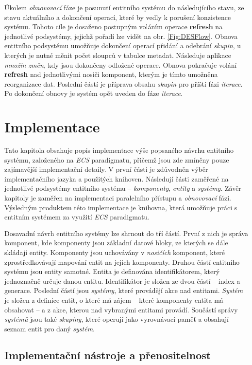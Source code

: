 Úkolem \emph{obnovovací} fáze je posunutí entitního systému do následujícího stavu, ze stavu aktuálního a dokončení operací, které by vedly k porušení konzistence systému. Tohoto cíle je dosaženo postupným voláním operace \textbf{refresh} na jednotlivé podsystémy, jejichž pořadí lze vidět na obr. \ref{Fig:DESFlow}. Obnova entitního podsystému umožňuje dokončení operací přidání a odebrání \emph{skupin}, u kterých je nutné měnit počet sloupců v tabulce metadat. Následuje aplikace \emph{množin změn}, kdy jsou dokončeny odložené operace. Obnova pokračuje volání \textbf{refresh} nad jednotlivými nosiči komponent, kterým je tímto umožněna reorganizace dat. Poslední částí je příprava obsahu \emph{skupin} pro příští fázi \emph{iterace}. Po dokončení obnovy je systém opět uveden do fáze \emph{iterace}.

\chapter{Implementace}

Tato kapitola obsahuje popis implementace výše popsaného návrhu entitního systému, založeného na \emph{ECS} paradigmatu, přičemž jsou zde zmíněny pouze zajímavější implementační detaily. V první části je zdůvodněn výběr implementačního jazyka a použitých knihoven. Následují části zaměřené na jednotlivé podsystémy entitního systému -- \emph{komponenty}, \emph{entity} a \emph{systémy}. Závěr kapitoly je zaměřen na implementaci paralelního přístupu a \emph{obnovovací} fázi. Výsledným produktem této implementace je knihovna, která umožňuje práci s entitním systémem za využití \emph{ECS} paradigmatu. 

Dosavadní návrh entitního systémy lze shrnout do tří částí. První z nich je správa komponent, kde komponenty jsou základní datové bloky, ze kterých se dále skládají entity. Komponenty jsou uchovávány v \emph{nosičích} komponent, které zprostředkovávají mapování entit na jejich komponenty. Druhou částí entitního systému jsou entity samotné. Entita je definována identifikátorem, který jednoznačně určuje danou entitu. Identifikátor je složen ze dvou částí -- index a generace. Poslední částí jsou \emph{systémy}, které provádějí akce nad entitami. \emph{Systém} je složen z definice entit, o které má zájem -- které komponenty entita má obsahovat -- a z akce, kterou nad vybranými entitami provádí. Součástí správy \emph{systémů} jsou také \emph{skupiny}, které operují jako vyrovnávací paměť a obsahují seznam entit pro daný \emph{systém}. 

\section{Implementační nástroje a přenositelnost}

